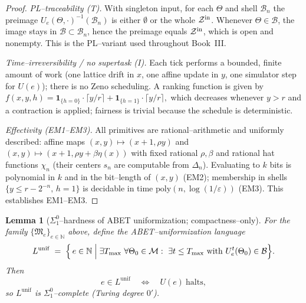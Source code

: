 \documentclass[12pt]{article}
\theoremstyle{definition}
\theoremstyle{plain}
\newtheorem{lemma}{Lemma}[section]
\begin{document}
\begin{proof}
\smallskip
\emph{PL–traceability (T).}
With singleton input, for each \(\Theta\) and shell \(\mathcal B_n\) the preimage
\(U_e(\Theta,\cdot)^{-1}(\mathcal B_n)\) is either \(\emptyset\) or the whole
\(\mathcal Z^{\rm in}\).  Whenever \(\Theta\in\mathcal B\), the image stays in
\(\mathcal B\subset\mathcal B_n\), hence the preimage equals \(\mathcal Z^{\rm in}\),
which is open and nonempty.  This is the PL–variant used throughout Book~III.

\smallskip
\emph{Time–irreversibility / no supertask (I).}
Each tick performs a bounded, finite amount of work (one lattice drift in \(x\),
one affine update in \(y\), one simulator step for \(U(e)\)); there is no Zeno
scheduling.  A ranking function is given by
\(
f(x,y,h)=\mathbf 1_{\{h=0\}}\cdot \lceil y/r\rceil + \mathbf 1_{\{h=1\}}\cdot \lceil y/r\rceil,
\)
which decreases whenever \(y>r\) and a contraction is applied; fairness is trivial
because the schedule is deterministic.

\smallskip
\emph{Effectivity (EM1–EM3).}
All primitives are rational–arithmetic and uniformly described: affine maps
\((x,y)\mapsto(x+1,\rho y)\) and \((x,y)\mapsto(x+1,\rho y+\beta\eta(x))\) with
fixed rational \(\rho,\beta\) and rational hat functions \(\chi_n\) (their
centers \(s_n\) are computable from \(\Delta_n\)).  Evaluating to \(k\) bits is
polynomial in \(k\) and in the bit–length of \((x,y)\) (EM2); membership in
shells \(\{y\le r-2^{-n},\,h=1\}\) is decidable in time \(\mathrm{poly}(n,\log(1/\varepsilon))\)
(EM3).  This establishes EM1–EM3.
\end{proof}

\begin{lemma}[\(\Sigma^0_1\)–hardness of ABET uniformization; compactness–only]
\label{lem:C-only-sigma1}
For the family \(\{\mathfrak M_e\}_{e\in\mathbb N}\) above, define the
\emph{ABET–uniformization language}
\[
  L^{\mathrm{unif}}
  \;=\;
  \Bigl\{\, e\in\mathbb N \;\Big|\;
     \exists T_{\max}\ \forall \Theta_0\in\mathcal M:\ 
     \exists t\le T_{\max}\ \text{with}\ U_e^t(\Theta_0)\in\mathcal B
  \Bigr\}.
\]
Then
\[
  e\in L^{\mathrm{unif}}
  \quad\Longleftrightarrow\quad
  U(e)\ \text{halts},
\]
so \(L^{\mathrm{unif}}\) is \(\Sigma^0_1\)–complete (Turing degree \(0'\)).
\end{lemma}
\end{document}

